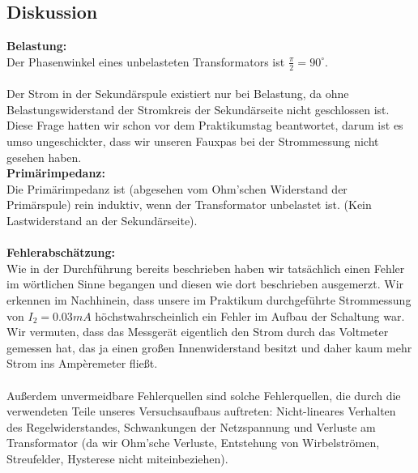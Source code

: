 \documentclass{article}
\begin{document}
\subsection{Diskussion}
\textbf{Belastung:}\\
Der Phasenwinkel eines unbelasteten Transformators ist $\frac{\pi}{2}=90^\circ$.\\
\\
Der Strom in der Sekundärspule existiert nur bei Belastung, da ohne Belastungswiderstand der Stromkreis der Sekundärseite nicht geschlossen ist. \\
Diese Frage hatten wir schon vor dem Praktikumstag beantwortet, darum ist es umso ungeschickter, dass wir unseren Fauxpas bei der Strommessung nicht gesehen haben.
\\
\textbf{Primärimpedanz:}\\
Die Primärimpedanz ist (abgesehen vom Ohm'schen Widerstand der Primärspule) rein induktiv, wenn der Transformator unbelastet ist. (Kein Lastwiderstand an der Sekundärseite).\\
\\
\textbf{Fehlerabschätzung:}\\
Wie in der Durchführung bereits beschrieben haben wir tatsächlich einen Fehler im wörtlichen Sinne begangen und diesen wie dort beschrieben ausgemerzt. Wir erkennen im Nachhinein, dass unsere im Praktikum durchgeführte Strommessung von $I_2=0.03mA$ höchstwahrscheinlich ein Fehler im Aufbau der Schaltung war. Wir vermuten, dass das Messgerät eigentlich den Strom durch das Voltmeter gemessen hat, das ja einen großen Innenwiderstand besitzt und daher kaum mehr Strom ins Ampèremeter fließt.\\
\\
Außerdem unvermeidbare Fehlerquellen sind solche Fehlerquellen, die durch die verwendeten Teile unseres Versuchsaufbaus auftreten: Nicht-lineares Verhalten des Regelwiderstandes, Schwankungen der Netzspannung und Verluste am Transformator (da wir Ohm'sche Verluste, Entstehung von Wirbelströmen, Streufelder, Hysterese nicht miteinbeziehen).
\end{document}
